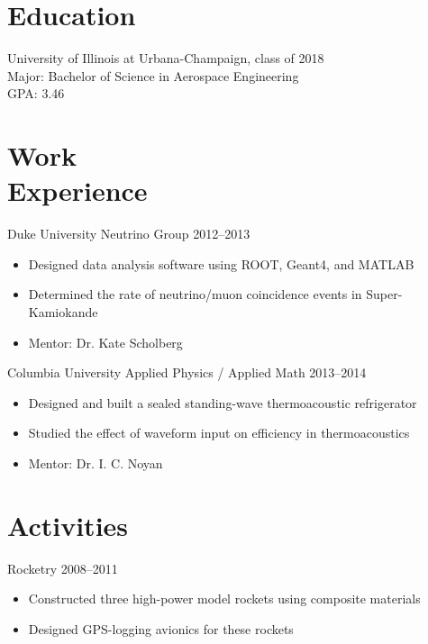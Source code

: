 \documentclass[margin]{res}
\begin{document}
 
\address{remy.goldschmidt@gmail.com \\ \url{http://github.com/taktoa} \\ \url{http://taktoa.me} \\ +1 (914) 703-5652 }

\begin{resume}

\section{Education} 
University of Illinois at Urbana-Champaign, class of 2018 \\
Major: Bachelor of Science in Aerospace Engineering \\
GPA: 3.46
\section{Work \\ Experience}
Duke University Neutrino Group \hfill 2012--2013
  \begin{itemize} \itemsep -2pt
    \item Designed data analysis software using ROOT, Geant4, and MATLAB
    \item Determined the rate of neutrino/muon coincidence events in Super-Kamiokande
    \item Mentor: Dr. Kate Scholberg
  \end{itemize}

Columbia University Applied Physics / Applied Math \hfill 2013--2014
  \begin{itemize} \itemsep -2pt
    \item Designed and built a sealed standing-wave thermoacoustic refrigerator
    \item Studied the effect of waveform input on efficiency in thermoacoustics
    \item Mentor: Dr. I. C. Noyan
  \end{itemize}

\section{Activities}
Rocketry \hfill 2008--2011
  \begin{itemize} \itemsep -2pt
    \item Constructed three high-power model rockets using composite materials
    \item Designed GPS-logging avionics for these rockets
  \end{itemize}


\end{resume}
\end{document}
